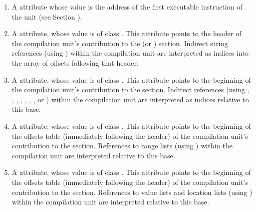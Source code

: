 \begin{enumerate}[1. ]
\item 
\hypertarget{chap:DWATentrypcofcompileunit}{}
\hypertarget{chap:DWATentrypcofpartialunit}{}
A \DWATentrypc{} attribute whose value is the address of the first
executable instruction of the unit (see 
Section ).

\item \hypertarget{chap:DWATstroffsetforindirectstringsection}{}
\bb
A \DWATstroffsetsDEFN{}
\eb
attribute, whose value is of class \CLASSstroffsetsptr. 
This attribute points to the 
\bb
header
\eb
of the compilation unit's contribution to the
\dotdebugstroffsets{} (or \dotdebugstroffsetsdwo{}) section. 
Indirect string references
(using \DWFORMstrxXNor) within the compilation unit are
interpreted as indices 
\bb
into the array of offsets following that header.
\eb

\item \hypertarget{chap:DWATaddrbaseforaddresstable}{}
A \DWATaddrbaseDEFN{}
attribute, whose value is of class \CLASSaddrptr.
This attribute points to the beginning of the compilation
unit's contribution to the \dotdebugaddr{} section.
Indirect references (using \DWFORMaddrxXN, \DWOPaddrx, 
\DWOPconstx, 
\DWLLEbaseaddressx{}, \DWLLEstartxendx{}, \DWLLEstartxlength{},
\DWRLEbaseaddressx{}, \DWRLEstartxendx{} or \DWRLEstartxlength) 
within the compilation unit are interpreted as indices 
relative to this base.

\item \hypertarget{chap:DWATrnglistsbaseforrnglists}{}
A \DWATrnglistsbaseDEFN{}
attribute, whose value is of class \CLASSrnglistsptr.
This attribute points to the beginning of the offsets table 
(immediately following the header) of the compilation
unit's contribution to the \dotdebugrnglists{} section.
References to range lists (using \DWFORMrnglistx)
within the compilation unit are
interpreted relative to this base.

\item \hypertarget{chap:DWATloclistsbaseinlocationlist}{}
A \DWATloclistsbaseDEFN{} 
attribute, whose value is of class \CLASSloclistsptr. 
This attribute points to the beginning of the offsets table 
(immediately following the header) of the compilation unit's 
contribution to the \dotdebugloclists{} section. References to 
\bb
value lists and
\eb
location lists (using \DWFORMloclistx) within the compilation 
unit are interpreted relative to this base.
\end{enumerate}

